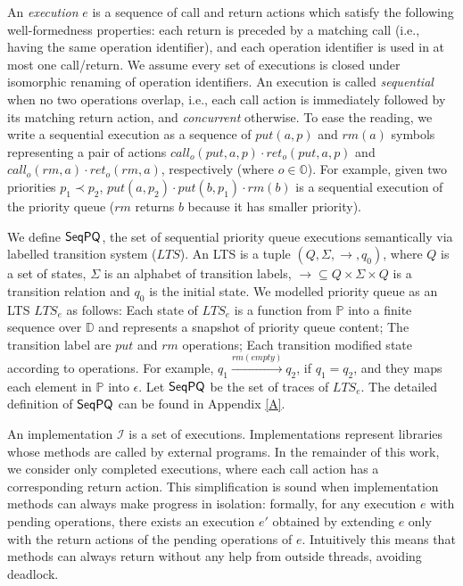 An \emph{execution} $e$ is a sequence of call and return actions which satisfy the following well-formedness properties: each return is preceded by a matching call (i.e., having the same operation identifier), and each operation identifier is used in at most one call/return. We assume every set of executions is closed under isomorphic renaming of operation identifiers. An execution is called \emph{sequential} when no two operations overlap, i.e., each call action is immediately followed by its matching return action, and \emph{concurrent} otherwise. To ease the reading, we write a sequential execution as a sequence of $\textit{put}(a,p)$ and $\textit{rm}(a)$ symbols representing a pair of actions $\textit{call}_o(\textit{put},a,p)\cdot \textit{ret}_o(\textit{put},a,p)$ and $\textit{call}_o(\textit{rm},a)\cdot \textit{ret}_o(\textit{rm},a)$, respectively (where $o\in\mathbb{O}$). For example, given two priorities $p_1 \prec p_2$, $\textit{put}(a,p_2) \cdot \textit{put}(b,p_1) \cdot \textit{rm}(b)$ is a sequential execution of the priority queue ($\textit{rm}$ returns $b$ because it has smaller priority).

We define $\mathsf{SeqPQ}$, the set of sequential priority queue executions semantically via labelled transition system ($LTS$). An LTS is a tuple $(Q,\Sigma,\rightarrow,q_0)$, where $Q$ is a set of states, $\Sigma$ is an alphabet of transition labels, $\rightarrow\subseteq Q\times\Sigma\times Q$ is a transition relation and $q_0$ is the initial state. We modelled priority queue as an LTS $\textit{LTS}_e$ as follows: Each state of $\textit{LTS}_e$ is a function from $\mathbb{P}$ into a finite sequence over $\mathbb{D}$ and represents a snapshot of priority queue content; The transition label are $\textit{put}$ and $\textit{rm}$ operations; Each transition modified state according to operations. For example, $q_1 \xrightarrow{\textit{rm}(\textit{empty})} q_2$, if $q_1 = q_2$, and they maps each element in $\mathbb{P}$ into $\epsilon$. Let $\mathsf{SeqPQ}$ be the set of traces of $\textit{LTS}_e$. The detailed definition of $\mathsf{SeqPQ}$ can be found in Appendix \ref{A}. 


An implementation $\mathcal{I}$ is a set of executions. Implementations represent libraries whose methods are called by external programs. In the remainder of this work, we consider only completed executions, where each call action has a corresponding return action. This simplification is sound when implementation methods can always make progress in isolation: formally, for any execution $e$ with pending operations, there exists an execution $e'$ obtained by extending $e$ only with the return actions of the pending operations of $e$. Intuitively this means that methods can always return without any help from outside threads, avoiding deadlock.


